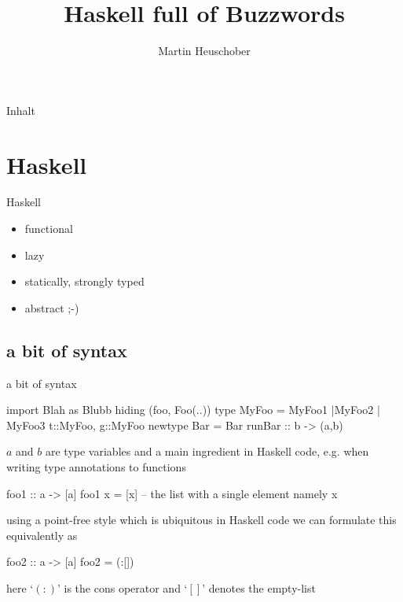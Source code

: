 \documentclass{beamer}
\title{Haskell full of Buzzwords}
\author{Martin Heuschober}
\institute{metalab.at/wiki/Lambdaheads}
\begin{document}
\begin{frame}
    \titlepage
\end{frame}

\begin{frame}[fragile]{Inhalt}
    \tableofcontents
\end{frame}

\section{Haskell} %
\label{sec:haskell}

\begin{frame}[fragile]{Haskell}
\begin{itemize}
    \item functional
    \item lazy
    \item statically, strongly typed
    \item abstract ;-)
\end{itemize}
\end{frame}

\subsection{a bit of syntax} %
\begin{frame}[fragile]{a bit of syntax}
\begin{code}%
    import Blah as Blubb hiding (foo, Foo(..))
    type MyFoo = MyFoo1 |MyFoo2 | MyFoo3 {t::MyFoo, g::MyFoo}
    newtype Bar = Bar {runBar :: b -> (a,b)}
\end{code}
$a$ and $b$ are type variables and a main ingredient in Haskell
code, e.g. when writing type annotations to functions
\begin{code}%
    foo1 :: a -> [a]
    foo1 x = [x] -- the list with a single element namely x
\end{code}
using a point-free style which is ubiquitous in Haskell code we can formulate
this equivalently as
\begin{code}%
    foo2 :: a -> [a]
    foo2 = (:[])
\end{code}
here ‘$(:)$’ is the cons operator and ‘$[]$’ denotes the empty-list
\end{frame}
\end{document}
